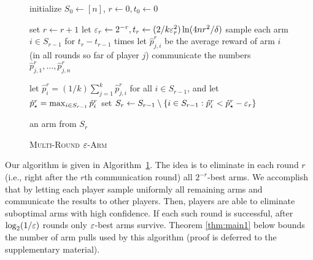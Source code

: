 \documentclass{article} %
\newcommand{\phat}{\hat{p}}
\begin{document}
\begin{wrapfigure}[19]{R}{0.5\textwidth}\begin{minipage}{0.5\textwidth}
\vspace{-12pt}

\begin{algorithm}[H] \caption{\textsc{Multi-Round $\varepsilon$-Arm}} \label{alg:algname}
\begin{algorithmic}[1]

\INPUT{$(\eps,\del)$}

\STATE initialize $S_0 \gets [n]$, $r \gets 0, t_0 \gets 0$

\REPEAT
	\STATE set $r \gets r+1$
	\STATE let $\varepsilon_r \gets 2^{-r}, t_r \gets (2/k\varepsilon_r^2) \ln (4 n r^2/\delta)$
		\STATE sample each arm $i \in S_{r-1}$  for $t_r - t_{r-1}$ times
		\STATE let $\phat_{j,i}^r$ be the average reward of arm $i$ (in all rounds
		so far of player $j$) 
		\STATE communicate the numbers $\phat_{j,1}^r, \ldots,
		\phat_{j,n}^r$
	\ENDFOR
	
	\STATE let $\phat_i^r = (1/k) \sum_{j=1}^k \phat_{j,i}^r$ for all $i \in S_{r-1}$,
		and let $\phat_{\st}^r = \max_{i \in S_{r-1}} \phat_i^r$
	\STATE set 
		$
		S_r \gets S_{r-1} \setminus 
		\{i \in S_{r-1} : \phat_i^r < \phat_{\st}^r - \eps_r\}
		$

 an arm from $S_r$

\end{algorithmic}
\end{algorithm}

\end{minipage}\end{wrapfigure}



Our algorithm is given in Algorithm~\ref{alg:algname}.
The idea is to eliminate in each round $r$ (i.e., right after the $r$th communication round) all $2^{-r}$-best arms.
We accomplish that by letting each player sample uniformly all remaining arms and communicate the results to other players. Then, players are able to eliminate suboptimal arms with high confidence.
If each such round is successful, after $\log_2(1/\varepsilon)$ rounds only $\varepsilon$-best arms survive.
Theorem \ref{thm:main1} below bounds the number of arm pulls used by this algorithm (proof is deferred to the supplementary material).
\end{document}
